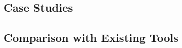 


\subsection{Case Studies}\label{subsec:go-safer:evaluation:case-studies}




\subsection{Comparison with Existing Tools}\label{subsec:go-safer:evaluation:linters-comparison}

